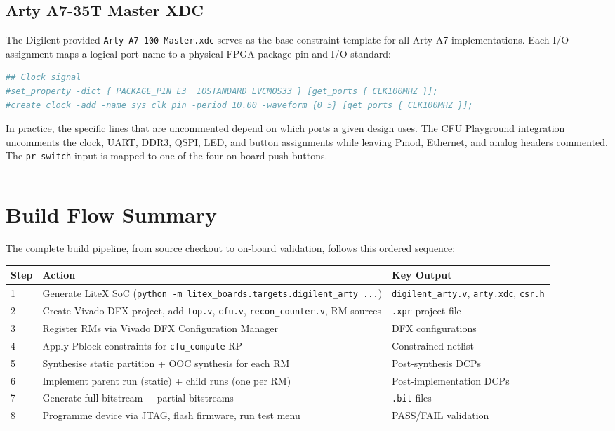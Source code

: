 \subsection{Arty A7-35T Master XDC}

The Digilent-provided \texttt{Arty-A7-100-Master.xdc} serves as the base constraint template for all Arty A7 implementations. Each I/O assignment maps a logical port name to a physical FPGA package pin and I/O standard:

\begin{lstlisting}[style=mystyle, language=tcl]
## Clock signal
#set_property -dict { PACKAGE_PIN E3  IOSTANDARD LVCMOS33 } [get_ports { CLK100MHZ }];
#create_clock -add -name sys_clk_pin -period 10.00 -waveform {0 5} [get_ports { CLK100MHZ }];
\end{lstlisting}

In practice, the specific lines that are uncommented depend on which ports a given design uses. The CFU Playground integration uncomments the clock, UART, DDR3, QSPI, LED, and button assignments while leaving Pmod, Ethernet, and analog headers commented. The \texttt{pr\_switch} input is mapped to one of the four on-board push buttons.

\vspace{0.4em}\hrule\vspace{0.4em}

\section{Build Flow Summary}

The complete build pipeline, from source checkout to on-board validation, follows this ordered sequence:

\begin{table}[htbp]
\centering
\begin{tabular}{lll}
\toprule
Step & Action & Key Output \\
\midrule
1 & Generate LiteX SoC (\texttt{python -m litex\_boards.targets.digilent\_arty ...}) & \texttt{digilent\_arty.v}, \texttt{arty.xdc}, \texttt{csr.h} \\
2 & Create Vivado DFX project, add \texttt{top.v}, \texttt{cfu.v}, \texttt{recon\_counter.v}, RM sources & \texttt{.xpr} project file \\
3 & Register RMs via Vivado DFX Configuration Manager & DFX configurations \\
4 & Apply Pblock constraints for \texttt{cfu\_compute} RP & Constrained netlist \\
5 & Synthesise static partition + OOC synthesis for each RM & Post-synthesis DCPs \\
6 & Implement parent run (static) + child runs (one per RM) & Post-implementation DCPs \\
7 & Generate full bitstream + partial bitstreams & \texttt{.bit} files \\
8 & Programme device via JTAG, flash firmware, run test menu & PASS/FAIL validation \\
\bottomrule
\end{tabular}
\end{table}

